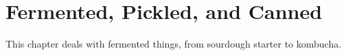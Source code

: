 \chapter{Fermented, Pickled, and Canned}
\label{fermentedPickledAndCanned}
This chapter deals with fermented things, from sourdough starter to kombucha.
\clearpage

%
%
%
